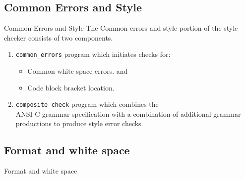 \documentclass[compress]{beamer}
\begin{document}
\subsection{Common Errors and Style}
\begin{frame}{Common Errors and Style}
The Common errors and style portion of the style checker consists of two components.
\begin{enumerate}
	\item  \textcolor{hsrmSec2}{\texttt{common\_errors}} program which initiates checks for:
		\begin{itemize}
			\item Common white space errors. and
			\item Code block bracket location.
		\end{itemize}
	\item  \textcolor{hsrmSec2}{\texttt{composite\_check}} program which combines the \\
			ANSI C grammar specification with a combination of additional 
			grammar productions to produce style error checks.  
\end{enumerate}

\end{frame}


\subsection{Format and white space}
\begin{frame}{Format and white space}
\end{frame}
\end{document}
